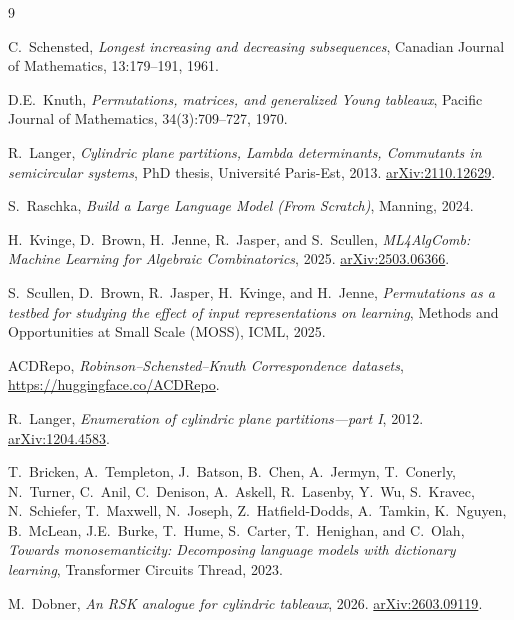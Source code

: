 \documentclass[11pt,a4paper]{article}
\begin{document}
\begin{thebibliography}{9}

C.~Schensted, \emph{Longest increasing and decreasing subsequences}, Canadian Journal of Mathematics, 13:179--191, 1961.

D.E.~Knuth, \emph{Permutations, matrices, and generalized Young tableaux}, Pacific Journal of Mathematics, 34(3):709--727, 1970.

R.~Langer, \emph{Cylindric plane partitions, Lambda determinants, Commutants in semicircular systems}, PhD thesis, Universit\'{e} Paris-Est, 2013. \href{https://arxiv.org/abs/2110.12629}{arXiv:2110.12629}.

S.~Raschka, \emph{Build a Large Language Model (From Scratch)}, Manning, 2024.

H.~Kvinge, D.~Brown, H.~Jenne, R.~Jasper, and S.~Scullen, \emph{ML4AlgComb: Machine Learning for Algebraic Combinatorics}, 2025. \href{https://arxiv.org/abs/2503.06366}{arXiv:2503.06366}.

S.~Scullen, D.~Brown, R.~Jasper, H.~Kvinge, and H.~Jenne, \emph{Permutations as a testbed for studying the effect of input representations on learning}, Methods and Opportunities at Small Scale (MOSS), ICML, 2025.

ACDRepo, \emph{Robinson--Schensted--Knuth Correspondence datasets}, \url{https://huggingface.co/ACDRepo}.

R.~Langer, \emph{Enumeration of cylindric plane partitions---part {I}}, 2012. \href{https://arxiv.org/abs/1204.4583}{arXiv:1204.4583}.

T.~Bricken, A.~Templeton, J.~Batson, B.~Chen, A.~Jermyn, T.~Conerly, N.~Turner, C.~Anil, C.~Denison, A.~Askell, R.~Lasenby, Y.~Wu, S.~Kravec, N.~Schiefer, T.~Maxwell, N.~Joseph, Z.~Hatfield-Dodds, A.~Tamkin, K.~Nguyen, B.~McLean, J.E.~Burke, T.~Hume, S.~Carter, T.~Henighan, and C.~Olah, \emph{Towards monosemanticity: Decomposing language models with dictionary learning}, Transformer Circuits Thread, 2023.

M.~Dobner, \emph{An RSK analogue for cylindric tableaux}, 2026. \href{https://arxiv.org/abs/2603.09119}{arXiv:2603.09119}.

\end{thebibliography}
\end{document}

